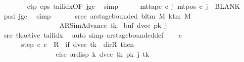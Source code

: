 \begin{isabellebody}
\ \ \ \ \ \ \isamarkupfalse%
\ c{\isacharunderscore}{\kern0pt}tp\ c{\isacharunderscore}{\kern0pt}ps\ tail{\isacharunderscore}{\kern0pt}idx{\isacharbrackleft}{\kern0pt}OF\ jge{\isacharbrackright}{\kern0pt}\ \isamarkupfalse%
\ simp\isanewline
\ \ \ \ \isamarkupfalse%
\ {\isachardoublequoteopen}mt{\isacharunderscore}{\kern0pt}tape\ c\ j{\isacharprime}{\kern0pt}\ {\isacharparenleft}{\kern0pt}mt{\isacharunderscore}{\kern0pt}pos\ c\ j{\isacharprime}{\kern0pt}{\isacharparenright}{\kern0pt}\ {\isacharequal}{\kern0pt}\ BLANK{}{\isachardoublequoteclose}\ \isamarkupfalse%
\ pad{}\ jge\ \isamarkupfalse%
\ simp\isanewline
\ \ \isamarkupfalse%
\isanewline
\ \ \isamarkupfalse%
\ src{\isacharunderscore}{\kern0pt}c{\isacharcolon}{\kern0pt}\ {\isachardoublequoteopen}ar{\isacharunderscore}{\kern0pt}stage{\isacharunderscore}{\kern0pt}bounded\ {\isacharparenleft}{\kern0pt}bl{\isacharunderscore}{\kern0pt}tm\ M{\isacharparenright}{\kern0pt}\ {\isacharparenleft}{\kern0pt}k{\isacharunderscore}{\kern0pt}tm\ M{\isacharparenright}{\kern0pt}\isanewline
\ \ \ \ \ \ \ \ \ \ \ \ \ \ \ \ \ {\isacharparenleft}{\kern0pt}AR{\isacharunderscore}{\kern0pt}SimAdvance{\isacharcomma}{\kern0pt}\ {\isacharquery}{\kern0pt}tk{\isacharcomma}{\kern0pt}\ {}{\isacharcomma}{\kern0pt}\ buf{}{\isacharcomma}{\kern0pt}\ dvec{\isacharcomma}{\kern0pt}\ {\isacharquery}{\kern0pt}pk\ j{\isacharparenright}{\kern0pt}{\isachardoublequoteclose}\isanewline
\ \ \ \ \isamarkupfalse%
\ src{}\ tk{\isacharunderscore}{\kern0pt}active\ tail{\isacharunderscore}{\kern0pt}idx\ \isamarkupfalse%
\ {\isacharparenleft}{\kern0pt}auto\ simp{\isacharcolon}{\kern0pt}\ ar{\isacharunderscore}{\kern0pt}stage{\isacharunderscore}{\kern0pt}bounded{\isacharunderscore}{\kern0pt}def{\isacharparenright}{\kern0pt}\isanewline
\ \ \isamarkupfalse%
\ c{\isacharprime}{\kern0pt}\ \isanewline
\ \ \ \ \ \ step{\isacharcolon}{\kern0pt}\ {\isachardoublequoteopen}{\isacharparenleft}{\kern0pt}c{\isacharcomma}{\kern0pt}\ c{\isacharprime}{\kern0pt}{\isacharparenright}{\kern0pt}\ {\isasymin}\ {\isacharquery}{\kern0pt}R\ {\isacharcircum}{\kern0pt}{\isacharcircum}{\kern0pt}\ {\isacharparenleft}{\kern0pt}if\ dvec\ {\isacharquery}{\kern0pt}tk\ {\isacharequal}{\kern0pt}\ dir{\isachardot}{\kern0pt}R\ then\ {}\isanewline
\ \ \ \ \ \ \ \ \ \ \ \ \ \ \ \ else\ ar{\isacharunderscore}{\kern0pt}disp\ {\isacharquery}{\kern0pt}k\ {\isacharparenleft}{\kern0pt}dvec\ {\isacharquery}{\kern0pt}tk{\isacharparenright}{\kern0pt}\ {\isacharparenleft}{\kern0pt}{\isacharquery}{\kern0pt}pk\ j\ {\isacharquery}{\kern0pt}tk{\isacharparenright}{\kern0pt}{\isacharparenright}{\kern0pt}{\isachardoublequoteclose}\isanewline

\end{isabellebody}
